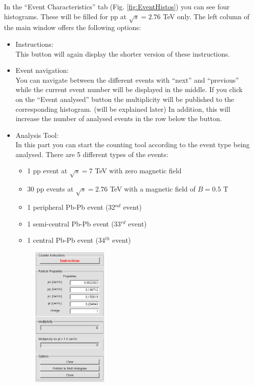 \documentclass{article}
\begin{document}
In the ``Event Characteristics'' tab  (Fig. \ref{fig:EventHistos}) you can see 
four histograms. These will be filled for pp at $\sqrt{s} = 2.76$ TeV only. 	
The left column of the main window offers the following options:

\begin{itemize}
\item Instructions:\\
  This button will again display the shorter version of these instructions.
\item Event navigation:\\
  You can navigate between the different events with ``next'' and ``previous''
  while the current event number will be displayed in the middle. 
  If you click on the ``Event analysed'' button the multiplicity will be 
  published to the corresponding histogram. (will be explained later)
  In addition, this will increase the number of analysed events in the row 
  below the button.
\item Analysis Tool:\\
  In this part you can start the counting tool according to the event type 
  being analysed. There are 5 different types of the events:
  \begin{itemize}
  \item 1 pp event at $\sqrt{s} = 7$ TeV with zero magnetic field
  \item 30 pp events at $\sqrt{s} = 2.76$ TeV with a magnetic field of $B= 0.5$ T
  \item 1 peripheral Pb-Pb event (32$^{nd}$ event)
  \item 1 semi-central Pb-Pb event (33$^{rd}$ event)
  \item 1 central Pb-Pb event (34$^{th}$ event)
  \end{itemize}
  \begin{figure}
    \centering
    \includegraphics[width=0.35\textwidth]{CounterNormalPP.png} \hspace{0.5cm}

\end{figure}
\end{itemize}
\end{document}
